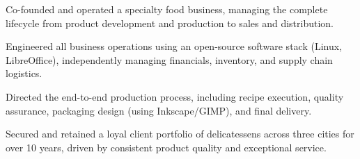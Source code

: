 \vspace{-.5em}
\begin{zitemize}
  \item
    Co-founded and operated a specialty food business, managing the complete lifecycle from product development and production to sales and distribution.
  \item
    Engineered all business operations using an open-source software stack (Linux, LibreOffice), independently managing financials, inventory, and supply chain logistics.
  \item
    Directed the end-to-end production process, including recipe execution, quality assurance, packaging design (using Inkscape/GIMP), and final delivery.
  \item
    Secured and retained a loyal client portfolio of delicatessens across three cities for over 10 years, driven by consistent product quality and exceptional service.
\end{zitemize}

